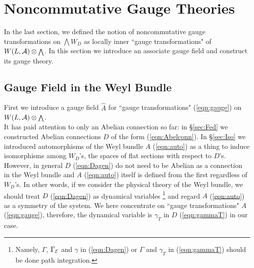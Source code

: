 \documentclass[10pt,a4paper]{article}
\def\hA{{\hat A}}
\begin{document}
\section{Noncommutative Gauge Theories}
\label{sec:ncgf}

In the last section, we defined the notion of noncommutative gauge transformations on ${\scriptstyle \bigwedge}W_D$ as locally inner ``gauge transformations" of $W(L,{\cal A})\otimes{\scriptstyle \bigwedge}$. In this section we introduce an associate gauge field and construct its gauge theory. \\


\subsection{Gauge Field in the Weyl Bundle
\label{sec:gfiw}}

First we introduce a gauge field $\hA$ for ``gauge transformations" (\ref{eqn:gauge}) on $W(L,{\cal A})\otimes {\scriptstyle \bigwedge}$.\\

It has paid attention to only an Abelian connection so far: in \S\ref{sec:Fed} we constructed Abelian connections $D$ of the form (\ref{eqn:Abelconn}). In \S\ref{sec:Iso} we introduced automorphisms of the Weyl bundle $A$ (\ref{eqn:auto}) as a thing to induce isomorphisms among $W_D$'s, the spaces of flat sections with respect to $D$'s. However, in general $D$ (\ref{eqn:Dagen}) do not need to be Abelian as a connection in the Weyl bundle and $A$ (\ref{eqn:auto}) itself is defined from the first regardless of $W_D$'s. In other words, if we consider the physical theory of the Weyl bundle, we should treat $D$ (\ref{eqn:Dagen}) as dynamical variables
\footnote{Namely, $\Gamma$, $\Gamma_{\cal E}$ and $\gamma$ in (\ref{eqn:Dagen}) or $\Gamma$ and $\gamma_T$ in (\ref{eqn:gammaT}) should be done path integration.}
 and regard $A$ (\ref{eqn:auto}) as a symmetry of the system. We here concentrate on ``gauge transformations" $A$ (\ref{eqn:gauge}), therefore, the dynamical variable is $\gamma_T$ in $D$ (\ref{eqn:gammaT}) in our case. \\
\end{document}
